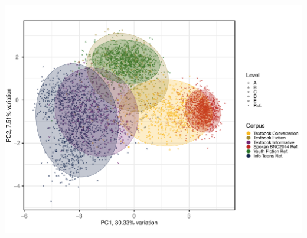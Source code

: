 \documentclass[
  letterpaper,
  DIV=11,
  numbers=noendperiod]{scrreprt}
\begin{document}
\includegraphics{G_Ch7_Analysis_files/figure-pdf/PCAtools-biplots-TxB-1.pdf}
\end{document}
